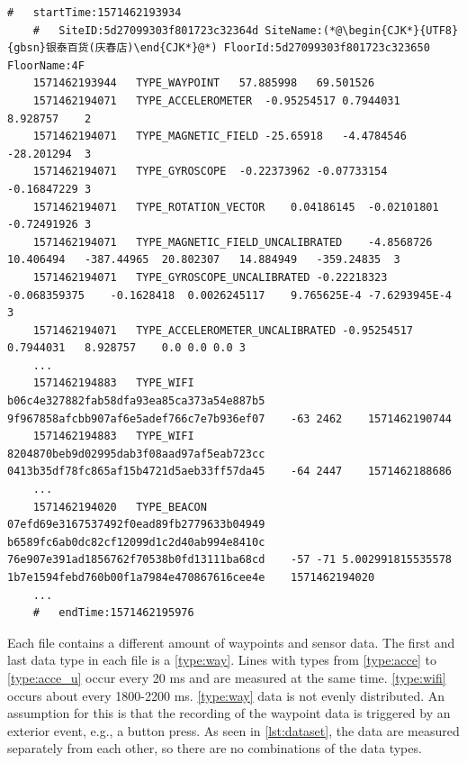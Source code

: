 
\begin{lstlisting}[caption={A snippet from the dataset of a file of the floor F4 of the site with the ID 5d27099303f801723c32364d},label={lst:dataset},captionpos=b]
    #   startTime:1571462193934
    #   SiteID:5d27099303f801723c32364d SiteName:(*@\begin{CJK*}{UTF8}{gbsn}银泰百货(庆春店)\end{CJK*}@*) FloorId:5d27099303f801723c323650 FloorName:4F
    1571462193944   TYPE_WAYPOINT   57.885998   69.501526
    1571462194071   TYPE_ACCELEROMETER  -0.95254517 0.7944031   8.928757    2
    1571462194071   TYPE_MAGNETIC_FIELD -25.65918   -4.4784546  -28.201294  3
    1571462194071   TYPE_GYROSCOPE  -0.22373962 -0.07733154 -0.16847229 3
    1571462194071   TYPE_ROTATION_VECTOR    0.04186145  -0.02101801 -0.72491926 3
    1571462194071   TYPE_MAGNETIC_FIELD_UNCALIBRATED    -4.8568726  10.406494   -387.44965  20.802307   14.884949   -359.24835  3
    1571462194071   TYPE_GYROSCOPE_UNCALIBRATED -0.22218323 -0.068359375    -0.1628418  0.0026245117    9.765625E-4 -7.6293945E-4   3
    1571462194071   TYPE_ACCELEROMETER_UNCALIBRATED -0.95254517 0.7944031   8.928757    0.0 0.0 0.0 3
    ...
    1571462194883   TYPE_WIFI   b06c4e327882fab58dfa93ea85ca373a54e887b5    9f967858afcbb907af6e5adef766c7e7b936ef07    -63 2462    1571462190744
    1571462194883   TYPE_WIFI   8204870beb9d02995dab3f08aad97af5eab723cc    0413b35df78fc865af15b4721d5aeb33ff57da45    -64 2447    1571462188686
    ...
    1571462194020   TYPE_BEACON 07efd69e3167537492f0ead89fb2779633b04949    b6589fc6ab0dc82cf12099d1c2d40ab994e8410c    76e907e391ad1856762f70538b0fd13111ba68cd    -57 -71 5.002991815535578   1b7e1594febd760b00f1a7984e470867616cee4e    1571462194020
    ...
    #   endTime:1571462195976
\end{lstlisting}

Each file contains a different amount of waypoints and sensor data.
The first and last data type in each file is a \ref{type:way}.
Lines with types from \ref{type:acce} to \ref{type:acce_u} occur every 20 ms and are measured at the same time.
\ref{type:wifi} occurs about every 1800-2200 ms.
\ref{type:way} data is not evenly distributed.
An assumption for this is that the recording of the waypoint data is triggered by an exterior event, e.g., a button press.
As seen in \cref{lst:dataset}, the data are measured separately from each other, so there are no combinations of the data types.

